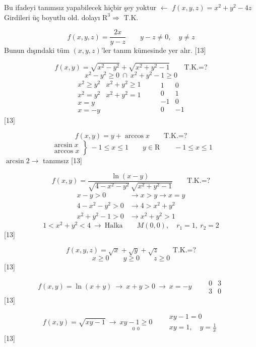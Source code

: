 \documentclass[11pt,a4paper]{article}
\begin{document}
Bu ifadeyi tanımsız yapabilecek hiçbir şey yoktur $\leftarrow$ $f(x,y,z)=x^2+y^2-4z$\\
Girdileri üç boyutlu old. dolayı $\mathrm{R}^3\Rightarrow$ T.K.

\[ f(x,y,z)=\frac{2x}{y-z}\qquad y-z\neq0,\quad y\neq z \]
Bunun dışındaki tüm $(x,y,z)$'ler tanım kümesinde yer alır.
[13]

\[ f(x,y)=\sqrt{x^2-y^2}+\sqrt{x^2+y^2-1}\qquad \text{T.K.=?} \]
\[ x^2-y^2\ge0\ \cap\ x^2+y^2-1\ge0 \]
\[ \begin{array}{ll}x^2\ge y^2 & x^2+y^2\ge1\\ x^2=y^2 & x^2+y^2=1\\ x=y & \\ x=-y & \end{array}\qquad \begin{array}{rr}1&0\\0&1\\-1&0\\0&-1\end{array} \]
[13]

\[ f(x,y)=y+\arccos x\qquad \text{T.K.=?} \]
\[ \left.\begin{array}{l}\arcsin x\\ \arccos x\end{array}\right\}\ -1\le x\le1\qquad y\in\mathrm{R}\qquad -1\le x\le1 \]
$\arcsin 2\to$ tanımsız
[13]

\[ f(x,y)=\frac{\ln(x-y)}{\sqrt{4-x^2-y^2}\,\sqrt{x^2+y^2-1}}\qquad \text{T.K.=?} \]
\begin{align*}
x-y>0&\to x>y\to x=y\\
4-x^2-y^2>0&\to 4>x^2+y^2\\
x^2+y^2-1>0&\to x^2+y^2>1
\end{align*}
\[ 1<x^2+y^2<4\ \to\ \text{Halka}\qquad M(0,0),\quad r_1=1,\ r_2=2 \]
[13]

\[ f(x,y,z)=\sqrt x+\sqrt y+\sqrt z\qquad \text{T.K.=?} \]
\[ x\ge0\qquad y\ge0\qquad z\ge0 \]
[13]

\[ f(x,y)=\ln(x+y)\ \to\ x+y>0\ \to\ x=-y\qquad \begin{array}{cc}0&3\\3&0\end{array} \]
[13]

\[ f(x,y)=\sqrt{xy-1}\ \to\ \underset{0\ \ 0}{xy-1\ge0}\qquad \begin{array}{l}xy-1=0\\ xy=1,\quad y=\frac1x\end{array} \]
[13]
\end{document}
